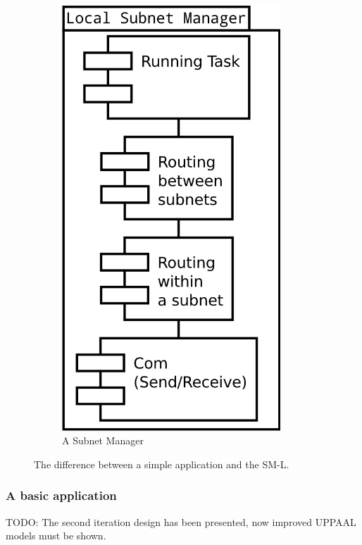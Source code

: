 \begin{figure}[h]
\begin{subfigure}[b]{.5\linewidth}
            \includegraphics[width=0.9\textwidth]{figures/iteration2_uml_sm_l}
            \caption{A Subnet Manager}
            \label{fig:iteration2_uml_sm_l}
        \end{subfigure}
    \caption{The difference between a simple application and the SM-L.}
\label{fig:iteration2_difference}
\end{figure}

\subsubsection{A basic application}
TODO: The second iteration design has been presented, now improved UPPAAL
models must be shown.

